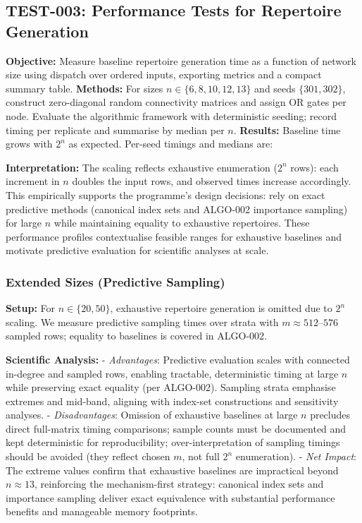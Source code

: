 \subsection{TEST-003: Performance Tests for Repertoire Generation}
\textbf{Objective:} Measure baseline repertoire generation time as a function of network size using dispatch over ordered inputs, exporting metrics and a compact summary table.
\textbf{Methods:} For sizes $n\in\{6,8,10,12,13\}$ and seeds $\{301,302\}$, construct zero-diagonal random connectivity matrices and assign OR gates per node. Evaluate the algorithmic framework with deterministic seeding; record timing per replicate and summarise by median per $n$.
\textbf{Results:} Baseline time grows with $2^n$ as expected. Per-seed timings and medians are:
\begin{center}
\end{center}
\medskip
\begin{center}
\end{center}
\textbf{Interpretation:} The scaling reflects exhaustive enumeration ($2^n$ rows): each increment in $n$ doubles the input rows, and observed times increase accordingly. This empirically supports the programme’s design decisions: rely on exact predictive methods (canonical index sets and ALGO-002 importance sampling) for large $n$ while maintaining equality to exhaustive repertoires. These performance profiles contextualise feasible ranges for exhaustive baselines and motivate predictive evaluation for scientific analyses at scale.

\subsubsection{Extended Sizes (Predictive Sampling)}
\textbf{Setup:} For $n\in\{20,50\}$, exhaustive repertoire generation is omitted due to $2^n$ scaling. We measure predictive sampling times over strata with $m\approx 512$--$576$ sampled rows; equality to baselines is covered in ALGO-002.
\begin{center}
\end{center}
\textbf{Scientific Analysis:}
- \emph{Advantages}: Predictive evaluation scales with connected in-degree and sampled rows, enabling tractable, deterministic timing at large $n$ while preserving exact equality (per ALGO-002). Sampling strata emphasise extremes and mid-band, aligning with index-set constructions and sensitivity analyses.
- \emph{Disadvantages}: Omission of exhaustive baselines at large $n$ precludes direct full-matrix timing comparisons; sample counts must be documented and kept deterministic for reproducibility; over-interpretation of sampling timings should be avoided (they reflect chosen $m$, not full $2^n$ enumeration).
- \emph{Net Impact}: The extreme values confirm that exhaustive baselines are impractical beyond $n\approx 13$, reinforcing the mechanism-first strategy: canonical index sets and importance sampling deliver exact equivalence with substantial performance benefits and manageable memory footprints.


